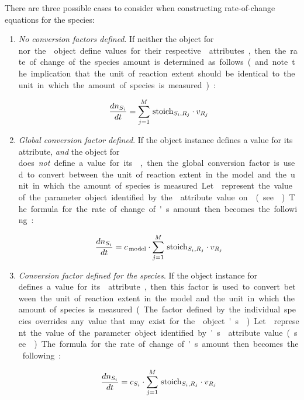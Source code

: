 There are three possible cases to consider when constructing
rate-of-change equations for the species:
\begin{enumerate}\setlength{\parskip}{-0.2ex}

\item \emph{No conversion factors defined}.  If neither the
  \Species object for \si nor the \Model object define values for
  their respective  attributes, then the
  rate of change of the species amount is determined as follows
  (and note the implication that the unit of reaction extent should
  be identical to the unit in which the amount of species \si is
  measured):
  \begin{linenomath}
    \begin{equation*}
      \frac{d n_{S_i}}{dt} = \sum_{j=1}^{M} \, \textrm{stoich}_{S_{i},R_{j}} \cdot v_{R_j} 
    \end{equation*}
  \end{linenomath}

\item \emph{Global conversion factor defined}.  If the \Model
  object instance defines a value for its 
  attribute, \emph{and} the \Species object for \si does
  \emph{not} define a value for its , then
  the global conversion factor is used to convert between the unit
  of reaction extent in the model and the unit in which the amount
  of species \si is measured.  Let \csg represent the value of the
  parameter object identified by the 
  attribute value on \Model (see
  ).  The formula for the
  rate of change of \si's amount then becomes the following:
  \begin{linenomath}
    \begin{equation*}
      \frac{d n_{S_i}}{dt} = c_{\,\textrm{model}} \cdot \sum_{j=1}^{M} \, \textrm{stoich}_{S_{i},R_{j}} \cdot v_{R_j} 
    \end{equation*}
  \end{linenomath}

\item \emph{Conversion factor defined for the species}.  If the
  \Species object instance for \si defines a value for its
   attribute, then this factor is used to
  convert between the unit of reaction extent in the model and the
  unit in which the amount of species \si is measured.  (The
  factor defined by the individual species overrides any value
  that may exist for the \Model object's
  .)  Let \csi represent the value of the
  parameter object identified by \si's 
  attribute value (see ).  The
  formula for the rate of change of \si's amount then becomes the
  following:
  \begin{linenomath}
    \begin{equation*}
      \frac{d n_{S_i}}{dt} = c_{S_i} \cdot \sum_{j=1}^{M} \, \textrm{stoich}_{S_{i},R_{j}} \cdot v_{R_j} 
    \end{equation*}
  \end{linenomath}

\end{enumerate}
\vspace*{-1ex}

